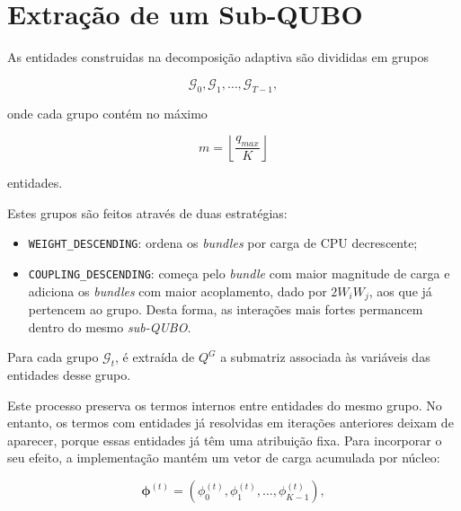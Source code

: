 \section{Extração de um Sub-QUBO}
\label{sec:extracao-subqubo}

As entidades construidas na decomposição adaptiva são divididas em grupos

\begin{equation}
    \mathcal{G}_0, \mathcal{G}_1, \dots, \mathcal{G}_{T-1},
\end{equation}

onde cada grupo contém no máximo

\begin{equation}
    m = \left\lfloor \frac{q_{max}}{K} \right\rfloor
\end{equation}

entidades. 

Estes grupos são feitos através de duas estratégias:

\begin{itemize}
    \item \texttt{WEIGHT\_DESCENDING}: ordena os \textit{bundles} por carga
    de CPU decrescente;

    \item \texttt{COUPLING\_DESCENDING}: começa pelo \textit{bundle} com
    maior magnitude de carga e adiciona os \textit{bundles} com maior
    acoplamento, dado por $2W_iW_j$, aos que já pertencem ao grupo. Desta forma, as interações mais fortes permancem dentro do mesmo \textit{sub-QUBO}.
\end{itemize}

Para cada grupo $\mathcal{G}_t$, é extraída de $Q^{G}$ a submatriz associada às
variáveis das entidades desse grupo. 

Este processo preserva os termos internos entre entidades do mesmo grupo. No
entanto, os termos com entidades já resolvidas em iterações anteriores
deixam de aparecer, porque essas entidades já têm uma
atribuição fixa. Para incorporar o seu efeito, a implementação mantém um vetor
de carga acumulada por núcleo:

\begin{equation}
    \boldsymbol{\phi}^{(t)} =
    \left(\phi^{(t)}_0, \phi^{(t)}_1, \dots, \phi^{(t)}_{K-1}\right),
\end{equation}

